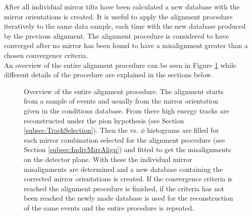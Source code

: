 After all individual mirror tilts have been calculated a new database with the mirror orientations is created. It is useful to apply the alignment procedure iteratively to the same data sample, each time with the new database produced by the previous alignment. The alignment procedure is considered to have converged after no mirror has been found to have a misalignment greater than a chosen convergence criteria. \\
An overview of the entire alignment procedure can be seen in Figure \ref{fig:RICH_Procedure} while different details of the procedure are explained in the sections below.\\

\begin{figure}[h!]
  \vspace{-0.5\baselineskip}
  \caption{Overview of the entire alignment procedure. The alignment starts from a sample of events and usually from the mirror orientation given in the \lhcb conditions database. From there high energy tracks are reconstructed under the pion hypothesis (see Section \ref{subsec:TrackSelection}). Then the \deltatheta vs. $\phi$ histograms are filled for each mirror combination selected for the alignment procedure (see Section \ref{subsec:IndivMirrAlign}) and fitted to get the misalignments on the detector plane. With these the individual mirror misalignments are determined and a new database containing the corrected mirror orientations is created. If the convergence criteria is reached the alignment procedure is finished, if the criteria has not been reached the newly made database is used for the reconstruction of the same events and the entire procedure is repeated.}
  \label{fig:RICH_Procedure}
  \vspace{-0.5\baselineskip}
\end{figure}


